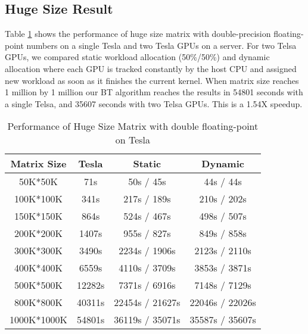 \subsection{Huge Size Result}
Table \ref{tab:hugeResultTesla} shows the performance of huge size matrix with double-precision floating-point numbers on a single Tesla and two Tesla GPUs on a server. For two Telsa GPUs, we compared static workload allocation (50\%/50\%) and dynamic allocation where each GPU is tracked constantly by the host CPU and assigned new workload as soon as it finishes the current kernel. 
When matrix size reaches 1 million by 1 million our BT algorithm reaches the results in 54801 seconds with a single Telsa, and 35607 seconds with two Telsa GPUs. This is a 1.54X speedup.
\begin{table}[h]
\vspace{-0.3in}
\caption{Performance of Huge Size Matrix with double floating-point on Tesla}
\vspace{-0.1in}
\centering
\begin{tabular}{|c|c|c|c|}
\hline
Matrix Size &  Tesla  & Static & Dynamic \\ \hline
 50K*50K    &    71s  &   50s /  45s &  44s / 44s \\ \hline
 100K*100K  &   341s  &  217s / 189s &  210s / 202s \\ \hline
 150K*150K  &   864s  &  524s / 467s &  498s / 507s \\ \hline
 200K*200K  &  1407s  &  955s / 827s &  849s / 858s \\ \hline
 300K*300K  &  3490s  & 2234s / 1906s & 2123s / 2110s\\ \hline
 400K*400K  &  6559s  & 4110s / 3709s & 3853s / 3871s\\ \hline
 500K*500K  & 12282s  & 7371s / 6916s  & 7148s / 7129s\\ \hline
 800K*800K  & 40311s  & 22454s / 21627s &  22046s / 22026s   \\ \hline
 1000K*1000K & 54801s  & 36119s / 35071s   &  35587s / 35607s \\ \hline
\end{tabular}
\label{tab:hugeResultTesla}
\vspace{-0.3in}
\end{table}

